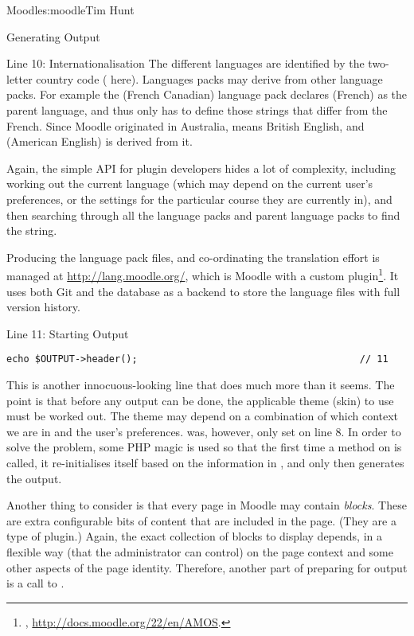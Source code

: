 \begin{aosachapter}{Moodle}{s:moodle}{Tim Hunt}
\begin{aosasect1}{Generating Output}
\begin{aosasect2}{Line 10: Internationalisation}
The different languages are identified by the two-letter country code
( here). Languages packs may derive from other language
packs. For example the  (French Canadian) language pack
declares  (French) as the parent language, and thus only has
to define those strings that differ from the French. Since Moodle
originated in Australia,  means British English, and
 (American English) is derived from it.

Again, the simple  API for plugin developers hides a
lot of complexity, including working out the current language (which
may depend on the current user's preferences, or the settings for the
particular course they are currently in), and then searching through
all the language packs and parent language packs to find the string.

Producing the language pack files, and co-ordinating the translation
effort is managed at \url{http://lang.moodle.org/}, which is Moodle
with a custom plugin\footnote{,
  \url{http://docs.moodle.org/22/en/AMOS}.}. It uses both Git and the
database as a backend to store the language files with full version
history.

\end{aosasect2}

\begin{aosasect2}{Line 11: Starting Output}

\begin{verbatim}
echo $OUTPUT->header();                                       // 11
\end{verbatim}

This is another innocuous-looking line that does much more than it
seems. The point is that before any output can be done, the applicable
theme (skin) to use must be worked out. The theme may depend on a
combination of which context we are in and the user's
preferences.  was, however, only
set on line 8. In order to solve the problem, some PHP magic is used
so that the first time a method on  is called, it
re-initialises itself based on the information in , and
only then generates the output.

Another thing to consider is that every page in Moodle may
contain \emph{blocks}. These are extra configurable bits of content
that are included in the page. (They are a type of plugin.) Again, the
exact collection of blocks to display depends, in a flexible way (that
the administrator can control) on the page context and some other
aspects of the page identity. Therefore, another part of preparing for
output is a call to
.


\end{aosasect2}
\end{aosasect1}
\end{aosachapter}
